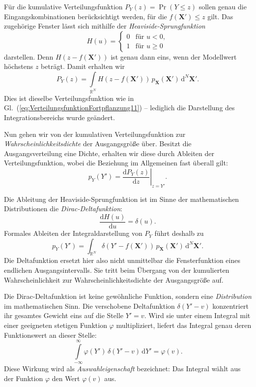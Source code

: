 Für die kumulative Verteilungsfunktion $P_Y(z)=\Pr(Y\leq z)$ sollen genau
die Eingangskombinationen berücksichtigt werden, für die
$f(\mathbf X')\leq z$ gilt.
Das zugehörige Fenster lässt sich mithilfe der
\textsl{Heaviside-Sprungfunktion}
\begin{equation}
H(u)
=
\begin{cases}
0 & \text{für }u<0,\\
1 & \text{für }u\geq0
\end{cases}
\end{equation}
darstellen. Denn $H(z-f(\mathbf X'))$ ist genau dann eins,
wenn der Modellwert höchstens $z$ beträgt.
Damit erhalten wir
\begin{equation}
P_Y(z)
=
\int\limits_{\mathbb R^N}
H\!\left(z-f(\mathbf X')\right)\,
p_{\mathbf X}(\mathbf X')\,\mathrm d^N\mathbf X'.
\label{eq:VerteilungsFortpflanzungHeaviside}
\end{equation}
Dies ist dieselbe Verteilungsfunktion wie in
Gl.~(\ref{eq:VerteilungsfunktionFortpflanzung11}) --
lediglich die Darstellung des Integrationsbereichs wurde geändert.

Nun gehen wir von der kumulativen Verteilungsfunktion zur
\emph{Wahrscheinlichkeitsdichte} der Ausgangsgröße über.
Besitzt die Ausgangsverteilung eine Dichte, erhalten wir diese
durch Ableiten der Verteilungsfunktion, wobei die Beziehung
im Allgemeinen fast überall gilt:
\begin{equation}
p_Y(Y')
=
\left.\frac{\mathrm d P_Y(z)}{\mathrm d z}\right|_{z=Y'}.
\end{equation}

Die Ableitung der Heaviside-Sprungfunktion ist im Sinne
der mathematischen Distributionen die
\textsl{Dirac-Deltafunktion}:
\begin{equation}
\frac{\mathrm d H(u)}{\mathrm d u}=\delta(u).
\end{equation}
Formales Ableiten der Integraldarstellung von $P_Y$
führt deshalb zu
\begin{equation}
p_Y(Y')
=
\int_{\mathbb R^N}
\delta\!\left(Y'-f(\mathbf X')\right)\,
p_{\mathbf X}(\mathbf X')\,\mathrm d^N\mathbf X'.
\end{equation}
Die Deltafunktion ersetzt hier also nicht unmittelbar
die Fensterfunktion eines endlichen Ausgangs\-intervalls.
Sie tritt beim Übergang von der kumulierten Wahrscheinlichkeit
zur Wahrscheinlichkeitsdichte der Ausgangsgröße auf.

Die Dirac-Deltafunktion ist keine gewöhnliche Funktion,
sondern eine \textsl{Distribution} im mathematischen Sinn.
Die verschobene Deltafunktion $\delta(Y'-v)$ konzentriert
ihr gesamtes Gewicht eins auf die Stelle $Y'=v$.
Wird sie unter einem Integral mit einer geeigneten stetigen
Funktion $\varphi$ multipliziert, liefert das Integral
genau deren Funktionswert an dieser Stelle:
\begin{equation}
\int\limits_{-\infty}^{\infty}
\varphi(Y')\,\delta(Y'-v)\,\mathrm dY'
=
\varphi(v).
\end{equation}
Diese Wirkung wird als \textsl{Auswahleigenschaft} bezeichnet:
Das Integral wählt aus der Funktion $\varphi$ den Wert
$\varphi(v)$ aus.

